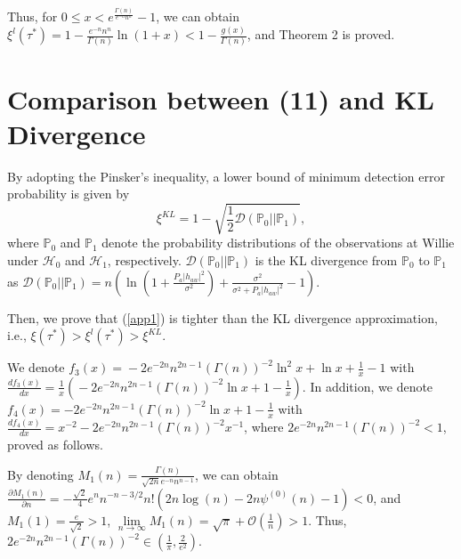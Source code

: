 \documentclass[conference]{IEEEtran}
\begin{document}
Thus, for $0 \le x < {e^{\frac{{\Gamma (n)}}{{{e^{ - n}}{n^n}}}}} - 1$, we can obtain $	{\xi ^{l}(\tau^*)} = 1 - \frac{{{e^{ - n}}{n^n}}}{{\Gamma \left( n \right)}}\ln \left( {1 + x} \right) \!<\! 1 \!-\! \frac{g\left( x \right)}{{\Gamma (n)}}$, and Theorem 2 is proved.

\section{Comparison between (11) and KL Divergence}\label{proof_corollary1}
By adopting the Pinsker’s inequality, a lower bound of minimum detection error probability is given by \cite{ECT2,DF}
\begin{equation}\label{KL_app}
	{\xi ^{KL}} = 1 - \sqrt {\frac{1}{2}\mathcal{D}\left( {{\mathbb{P}_0}||{\mathbb{P}_1}} \right)},
\end{equation}
where ${\mathbb{P}_0}$ and ${\mathbb{P}_1}$ denote the probability distributions of the observations at Willie under $\mathcal{H}_0$ and $\mathcal{H}_1$, respectively. $\mathcal{D}\left( {{\mathbb{P}_0}||{\mathbb{P}_1}} \right)$ is the KL divergence from ${\mathbb{P}_0}$ to ${\mathbb{P}_1}$ as $	\mathcal{D}\!\left( {{\mathbb{P}_0}||{\mathbb{P}_1}} \right)\! \!=\! n\!\left(\! {\ln\! \!\left(\! {1 \!+\! \frac{{{P_a}{{\left| {{h_{aw}}} \right|}^2}}}{{{\sigma ^2}}}} \!\right)\! \!+\! \frac{{{\sigma ^2}}}{{{\sigma ^2} \!+\! {P_a}{{\left| {{h_{aw}}} \right|}^2}}} \!-\! 1} \!\right)\!$.

Then, we prove that (\ref{app1}) is tighter than the KL divergence approximation, i.e., $\xi \left( {{\tau ^*}} \right) > {\xi ^{l}(\tau^*)} > {\xi ^{KL}}$.

We denote ${f_3}(x) \!\!\!=  \!\!-\! 2{e^{ - 2n}}{n^{2n - 1}}{\left( {\Gamma (n)} \right)^{ - 2}}{\ln ^2}x \!+\! \ln x \!+\! \frac{1}{x} \!\!-\!\! 1$ with $\frac{{d{f_3}(x)}}{{dx}} \!=\! \frac{1}{x}( \!-\! 2{e^{ - 2n}}{n^{2n - 1}}{\left( {\Gamma (n)} \right)^{ - 2}}\ln x \!+\! 1 \!-\! \frac{1}{x})$. In addition, we denote ${f_4}(x) =  - 2{e^{ - 2n}}{n^{2n - 1}}{\left( {\Gamma (n)} \right)^{ - 2}}\ln x + 1 - \frac{1}{x}$ with $\frac{{d{f_4}(x)}}{{dx}} = {x^{ - 2}} - 2{e^{ - 2n}}{n^{2n - 1}}{\left( {\Gamma (n)} \right)^{ - 2}}{x^{ - 1}}$, where $2{e^{ - 2n}}{n^{2n - 1}}{\left( {\Gamma (n)} \right)^{ - 2}} < 1$, proved as follows.

By denoting $M_1(n) = \frac{{\Gamma (n)}}{{\sqrt {2n} {e^{ - n}}{n^{n - 1}}}}$, we can obtain $\frac{{\partial M_1(n)}}{{\partial n}} =  - \frac{{\sqrt 2 }}{4}{e^n}{n^{ - n - 3/2}}n!\left( {2n\log (n) - 2n{\psi ^{(0)}}(n) - 1} \right) < 0$, and $M_1(1) = \frac{e}{{\sqrt 2 }} > 1$, $\mathop {\lim }\limits_{n \to \infty } M_1(n) = \sqrt \pi   + \mathcal{O}\left( {\frac{1}{n}} \right) > 1$. Thus, $2{e^{ - 2n}}{n^{2n - 1}}{\left( {\Gamma (n)} \right)^{ - 2}} \in \left( {\frac{1}{\pi },\frac{2}{{{e^2}}}} \right)$.
\end{document}

